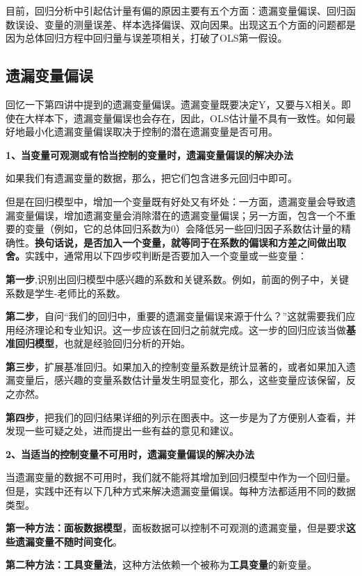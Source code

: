\documentclass[cn,12pt,math=newtx,citestyle=gb7714-2015,bibstyle=gb7714-2015]{elegantbook}
\begin{document}
目前，回归分析中引起估计量有偏的原因主要有五个方面：遗漏变量偏误、回归函数误设、变量的测量误差、样本选择偏误、双向因果。出现这五个方面的问题都是因为总体回归方程中回归量与误差项相关，打破了OLS第一假设。

\subsection{遗漏变量偏误}
回忆一下第四讲中提到的遗漏变量偏误。遗漏变量既要决定Y，又要与X相关。即使在大样本下，遗漏变量偏误也会存在，因此，OLS估计量不具有一致性。如何最好地最小化遗漏变量偏误取决于控制的潜在遗漏变量是否可用。

\textbf{1、当变量可观测或有恰当控制的变量时，遗漏变量偏误的解决办法}

如果我们有遗漏变量的数据，那么，把它们包含进多元回归中即可。

但是在回归模型中，增加一个变量既有好处又有坏处：一方面，遗漏变量会导致遗漏变量偏误，增加遗漏变量会消除潜在的遗漏变量偏误；另一方面，包含一个不重要的变量（例如，它的总体回归系数为0）会降低另一些回归因子系数估计量的精确性。\textbf{换句话说，是否加入一个变量，就等同于在系数的偏误和方差之间做出取舍。}实践中，通常用以下四步哎判断是否要加入一个变量或一些变量：

\textbf{第一步},识别出回归模型中感兴趣的系数和关键系数。例如，前面的例子中，关键系数是学生-老师比的系数。

\textbf{第二步}，自问“我们的回归中，重要的遗漏变量偏误来源于什么？”这就需要我们应用经济理论和专业知识。这一步应该在回归之前就完成。这一步的回归应该当做\textbf{基准回归模型}，也就是经验回归分析的开始。

\textbf{第三步}，扩展基准回归。如果加入的控制变量系数是统计显著的，或者如果加入遗漏变量后，感兴趣的变量系数估计量发生明显变化，那么，这些变量应该保留，反之亦然。

\textbf{第四步}，把我们的回归结果详细的列示在图表中。这一步是为了方便别人查看，并发现一些可疑之处，进而提出一些有益的意见和建议。

\textbf{2、当适当的控制变量不可用时，遗漏变量偏误的解决办法}

当遗漏变量的数据不可用时，我们就不能将其增加到回归模型中作为一个回归量。但是，实践中还有以下几种方式来解决遗漏变量偏误。每种方法都适用不同的数据类型。

\textbf{第一种方法：面板数据模型}，面板数据可以控制不可观测的遗漏变量，但是要求\textbf{这些遗漏变量不随时间变化}。

\textbf{第二种方法：工具变量法}，这种方法依赖一个被称为\textbf{工具变量}的新变量。
\end{document}
